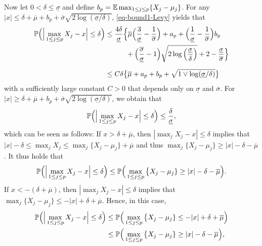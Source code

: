 \documentclass[a4paper,12pt]{article}
\begin{document}
Now let $0 < \delta \le \underline{\sigma}$ and define $b_p = \mathbb{E} \max_{1 \le j \le p} \{X_j - \mu_j\}$. For any $|x| \le \delta + \overline{\mu} + b_p + \overline{\sigma} \sqrt{2\log(\underline{\sigma}/\delta)}$, \eqref{eq-bound1-Levy} yields that 
\begin{align}
\pr \Big( \Big| \max_{1 \le j \le p} X_j - x \Big| \le \delta \Big) 
 & \le \frac{4 \delta}{\underline{\sigma}} \Big\{ \overline{\mu} \Big( \frac{3}{\underline{\sigma}} - \frac{1}{\overline{\sigma}} \Big) + a_p + \Big( \frac{1}{\underline{\sigma}} - \frac{1}{\overline{\sigma}} \Big) b_p \nonumber \\ & \phantom{\le \frac{4 \delta}{\underline{\sigma}} \Big\{} + \Big( \frac{\overline{\sigma}}{\underline{\sigma}} - 1 \Big) \sqrt{2\log\Big(\frac{\underline{\sigma}}{\delta}\Big)} + 2 - \frac{\underline{\sigma}}{\overline{\sigma}} \Big\} \nonumber \\[0.2cm]
 & \le C \delta \big\{ \overline{\mu} + a_p + b_p + \sqrt{1 \vee \log(\underline{\sigma}/\delta)} \big\} \label{eq-bound2-Levy}
\end{align}
with a sufficiently large constant $C > 0$ that depends only on $\underline{\sigma}$ and $\overline{\sigma}$. For $|x| \ge \delta + \overline{\mu} + b_p + \overline{\sigma}\sqrt{2\log(\underline{\sigma}/\delta)}$, we obtain that 
\begin{equation}\label{eq-bound3-Levy}
\mathbb{P} \Big( \Big| \max_{1 \le j \le p} X_j - x \Big| \le \delta \Big) \le \frac{\delta}{\underline{\sigma}}, 
\end{equation}
which can be seen as follows: If $x > \delta + \overline{\mu}$, then $|\max_j X_j - x| \le \delta$ implies that $|x| - \delta \le \max_j X_j \le \max_j \{ X_j - \mu_j \} + \overline{\mu}$ and thus $\max_j \{ X_j - \mu_j \} \ge |x| - \delta - \overline{\mu}$. It thus holds that 
\begin{equation}\label{eq-bound3-Levy-prep1}
\mathbb{P} \Big( \Big| \max_{1 \le j \le p} X_j - x \Big| \le \delta \Big) \le \mathbb{P} \Big( \max_{1 \le j \le p} \big\{ X_j - \mu_j \} \ge |x| - \delta - \overline{\mu} \Big). 
\end{equation}
If $x < - (\delta + \overline{\mu})$, then $|\max_j X_j - x| \le \delta$ implies that $\max_j \{ X_j - \mu_j \} \le -|x| + \delta + \overline{\mu}$. Hence, in this case,
\begin{align}
\mathbb{P} \Big( \Big| \max_{1 \le j \le p} X_j - x \Big| \le \delta \Big) 
 & \le \mathbb{P} \Big( \max_{1 \le j \le p} \big\{ X_j - \mu_j \} \le -|x| + \delta + \overline{\mu} \Big) \nonumber \\
 & \le \mathbb{P} \Big( \max_{1 \le j \le p} \big\{ X_j - \mu_j \} \ge |x| - \delta - \overline{\mu} \Big), \label{eq-bound3-Levy-prep2}
\end{align}
\end{document}
